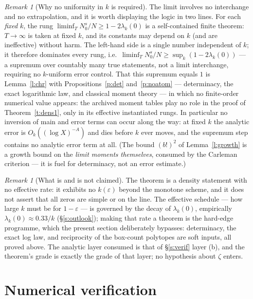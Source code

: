 \documentclass[11pt]{article}
\numberwithin{equation}{section}
\theoremstyle{definition}
\theoremstyle{remark}
\newtheorem{remark}[theorem]{Remark}
\begin{document}
\begin{remark}[Why no uniformity in $k$ is
required]\label{r:nounif}
The limit involves no interchange and no extrapolation, and
it is worth displaying the logic in two lines. For each
\emph{fixed} $k$, the rung
$\liminf_T N_0^{s}/N\ge1-2\lambda_k(0)$ is a self-contained
finite theorem: $T\to\infty$ is taken at fixed $k$, and its
constants may depend on $k$ (and are ineffective) without
harm. The left-hand side is a single number independent of
$k$; it therefore dominates every rung, i.e.\
$\liminf_T N_0^{s}/N\ge\sup_k(1-2\lambda_k(0))$ --- a
supremum over countably many true statements, not a limit
interchange, requiring no $k$-uniform error control. That
this supremum equals $1$ is Lemma~\ref{l:chr} with
Propositions~\ref{p:det} and~\ref{p:noatom} --- determinacy,
the exact logarithmic law, and classical moment theory ---
in which no finite-order numerical value appears: the
archived moment tables play no role in the proof of
Theorem~\ref{t:dens1}, only in its effective instantiated
rungs. In particular no inversion of main and error terms
can occur along the way: at fixed $k$ the analytic error is
$O_k((\log X)^{-A})$ and dies before $k$ ever moves, and the
supremum step contains no analytic error term at all. (The
bound $(b!)^{2}$ of Lemma~\ref{l:growth} is a growth bound
on the \emph{limit moments themselves}, consumed by the
Carleman criterion --- it is fuel for determinacy, not an
error estimate.)
\end{remark}

\begin{remark}[What is and is not claimed]\label{r:dens}
The theorem is a density statement with no effective rate:
it exhibits no $k(\varepsilon)$ beyond the monotone scheme,
and it does not assert that all zeros are simple or on the
line. The effective schedule --- how large $k$ must be for
$1-\varepsilon$ --- is governed by the decay of
$\lambda_k(0)$, empirically $\lambda_k(0)\approx0.33/k$
(\S\ref{s:outlook}); making that rate a theorem is the
hard-edge programme, which the present section deliberately
bypasses: determinacy, the exact log law, and reciprocity
of the box-count polytopes are soft inputs, all proved
above. The analytic layer consumed is that of
\S\ref{s:verif} layer (b), and the theorem's grade is
exactly the grade of that layer; no hypothesis about
$\zeta$ enters.
\end{remark}

\section{Numerical verification}\label{s:faces}
\end{document}

